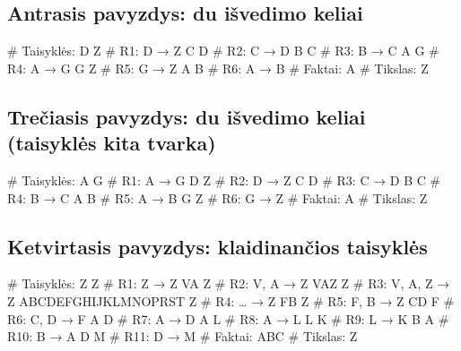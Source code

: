 \subsection{Antrasis pavyzdys: du išvedimo keliai}

\begin{pythonaienv}[bc]
# Taisyklės:
D Z                                     # R1: D → Z
C D                                     # R2: C → D
B C                                     # R3: B → C
A G                                     # R4: A → G
G Z                                     # R5: G → Z
A B                                     # R6: A → B
# Faktai:
A
# Tikslas:
Z
\end{pythonaienv}

\subsection{Trečiasis pavyzdys: du išvedimo keliai (taisyklės kita tvarka)}

\begin{pythonaienv}[bc]
# Taisyklės:
A G                                     # R1: A → G
D Z                                     # R2: D → Z
C D                                     # R3: C → D
B C                                     # R4: B → C
A B                                     # R5: A → B
G Z                                     # R6: G → Z
# Faktai:
A
# Tikslas:
Z
\end{pythonaienv}

\subsection{Ketvirtasis pavyzdys: klaidinančios taisyklės}

\begin{pythonaienv}[bc]
# Taisyklės:
Z Z                                     # R1:  Z → Z
VA Z                                    # R2:  V, A → Z
VAZ Z                                   # R3:  V, A, Z → Z
ABCDEFGHIJKLMNOPRST Z                   # R4:  … → Z
FB Z                                    # R5:  F, B → Z
CD F                                    # R6:  C, D → F
A D                                     # R7:  A → D
A L                                     # R8:  A → L
L K                                     # R9:  L → K
B A                                     # R10: B → A
D M                                     # R11: D → M
# Faktai:
ABC
# Tikslas:
Z
\end{pythonaienv}

